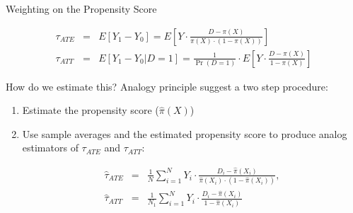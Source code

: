 \documentclass{beamer}
\newenvironment{Shaded}{}{}
\newcommand{\KeywordTok}[1]{\textcolor[rgb]{0.00,0.44,0.13}{\textbf{{#1}}}}
\newcommand{\DecValTok}[1]{\textcolor[rgb]{0.25,0.63,0.44}{{#1}}}
\newcommand{\FloatTok}[1]{\textcolor[rgb]{0.25,0.63,0.44}{{#1}}}
\newcommand{\StringTok}[1]{\textcolor[rgb]{0.25,0.44,0.63}{{#1}}}
\newcommand{\NormalTok}[1]{{#1}}
\numberwithin{equation}{section}
\begin{document}
\begin{frame}{Weighting on the Propensity Score}

\small

\begin{eqnarray*}
\tau_{ATE}&=&E[Y_1-Y_0]=E\left[
Y\cdot \frac{D-\pi(X)}{\pi(X)\cdot (1-\pi(X))}
\right]\\
\tau_{ATT}&=&E[Y_1-Y_0|D=1]=\frac{1}{\Pr(D=1)}\cdot E\left[
Y\cdot \frac{D-\pi(X)}{1-\pi(X)}
\right]
\end{eqnarray*}

How do we estimate this? \pause Analogy principle suggest a two step
procedure:

\begin{enumerate}
\def\labelenumi{\arabic{enumi}.}
\itemsep1pt\parskip0pt
\item
  Estimate the propensity score ($\widehat{\pi}(X)$)
\item
  Use sample averages and the estimated propensity score to produce
  analog estimators of $\tau_{ATE}$ and $\tau_{ATT}$:

  \begin{eqnarray*}
  \widehat{\tau}_{ATE}&=&\frac{1}{N} \sum_{i=1}^N
  Y_i\cdot \frac{D_i-\widehat{\pi}(X_i)}{\widehat{\pi}(X_i)\cdot
  (1-\widehat{\pi}(X_i))},\\
  \widehat{\tau}_{ATT}&=&\frac{1}{N_1} \sum_{i=1}^N
  Y_i\cdot \frac{D_i-\widehat{\pi}(X_i)}{1-\widehat{\pi}(X_i)}
  \end{eqnarray*}
\end{enumerate}

\end{frame}



\end{document}
